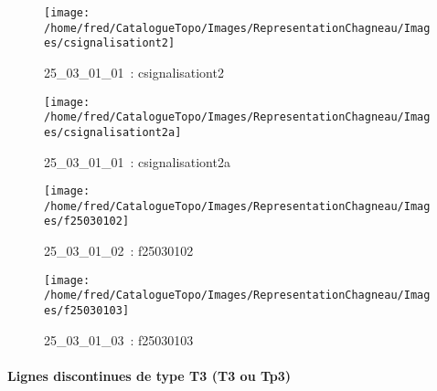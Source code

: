 \documentclass[12pt,titlepage]{book}
\begin{document}
\begin{figure}[h!]
  \hfill         %
  \begin{minipage}[t]{3cm}
    \begin{center}
      \texttt{[image: /home/fred/CatalogueTopo/Images/RepresentationChagneau/Images/csignalisationt2]}
      \caption[~25\_03\_01\_01]{\small{25\_03\_01\_01~:} \tiny{csignalisationt2}}\label{csignalisationt2}
    \end{center}
  \end{minipage}
  \begin{minipage}[t]{3cm}
    \begin{center}
      \texttt{[image: /home/fred/CatalogueTopo/Images/RepresentationChagneau/Images/csignalisationt2a]}
      \caption[~25\_03\_01\_01]{\small{25\_03\_01\_01~:} \tiny{csignalisationt2a}}\label{csignalisationt2a}
    \end{center}
  \end{minipage}
  \begin{minipage}[t]{3cm}
    \begin{center}
      \texttt{[image: /home/fred/CatalogueTopo/Images/RepresentationChagneau/Images/f25030102]}
      \caption[~25\_03\_01\_02]{\small{25\_03\_01\_02~:} \tiny{f25030102}}\label{f25030102}
    \end{center}
  \end{minipage}
  \begin{minipage}[t]{3cm}
    \begin{center}
      \texttt{[image: /home/fred/CatalogueTopo/Images/RepresentationChagneau/Images/f25030103]}
      \caption[~25\_03\_01\_03]{\small{25\_03\_01\_03~:} \tiny{f25030103}}\label{f25030103}
    \end{center}
  \end{minipage}
\end{figure}


\paragraph{Lignes discontinues de type T3 (T3 ou Tp3)}
\noindent
\vspace{\baselineskip}
\end{document}
